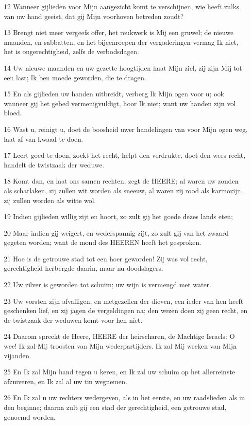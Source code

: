 \par 12 Wanneer gijlieden voor Mijn aangezicht komt te verschijnen, wie heeft zulks van uw hand geeist, dat gij Mijn voorhoven betreden zoudt?
\par 13 Brengt niet meer vergeefs offer, het reukwerk is Mij een gruwel; de nieuwe maanden, en sabbatten, en het bijeenroepen der vergaderingen vermag Ik niet, het is ongerechtigheid, zelfs de verbodsdagen.
\par 14 Uw nieuwe maanden en uw gezette hoogtijden haat Mijn ziel, zij zijn Mij tot een last; Ik ben moede geworden, die te dragen.
\par 15 En als gijlieden uw handen uitbreidt, verberg Ik Mijn ogen voor u; ook wanneer gij het gebed vermenigvuldigt, hoor Ik niet; want uw handen zijn vol bloed.
\par 16 Wast u, reinigt u, doet de boosheid uwer handelingen van voor Mijn ogen weg, laat af van kwaad te doen.
\par 17 Leert goed te doen, zoekt het recht, helpt den verdrukte, doet den wees recht, handelt de twistzaak der weduwe.
\par 18 Komt dan, en laat ons samen rechten, zegt de HEERE; al waren uw zonden als scharlaken, zij zullen wit worden als sneeuw, al waren zij rood als karmozijn, zij zullen worden als witte wol.
\par 19 Indien gijlieden willig zijt en hoort, zo zult gij het goede dezes lands eten;
\par 20 Maar indien gij weigert, en wederspannig zijt, zo zult gij van het zwaard gegeten worden; want de mond des HEEREN heeft het gesproken.
\par 21 Hoe is de getrouwe stad tot een hoer geworden! Zij was vol recht, gerechtigheid herbergde daarin, maar nu doodslagers.
\par 22 Uw zilver is geworden tot schuim; uw wijn is vermengd met water.
\par 23 Uw vorsten zijn afvalligen, en metgezellen der dieven, een ieder van hen heeft geschenken lief, en zij jagen de vergeldingen na; den wezen doen zij geen recht, en de twistzaak der weduwen komt voor hen niet.
\par 24 Daarom spreekt de Heere, HEERE der heirscharen, de Machtige Israels: O wee! Ik zal Mij troosten van Mijn wederpartijders. Ik zal Mij wreken van Mijn vijanden.
\par 25 En Ik zal Mijn hand tegen u keren, en Ik zal uw schuim op het allerreinste afzuiveren, en Ik zal al uw tin wegnemen.
\par 26 En Ik zal u uw rechters wedergeven, als in het eerste, en uw raadslieden als in den beginne; daarna zult gij een stad der gerechtigheid, een getrouwe stad, genoemd worden.
